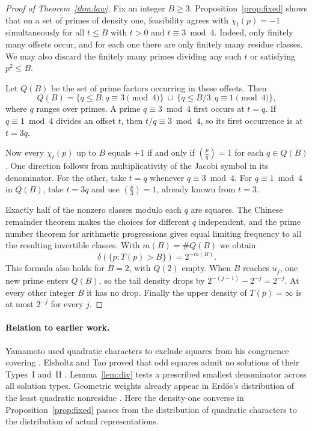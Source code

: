 \documentclass[11pt,a4paper]{article}
\theoremstyle{definition}
\newcommand{\jac}[2]{\left(\frac{#1}{#2}\right)}
\begin{document}
\begin{proof}[Proof of Theorem~\ref{thm:law}]
Fix an integer \(B\ge3\). Proposition~\ref{prop:fixed} shows that on
a set of primes of density one, feasibility agrees with
\(\chi_t(p)=-1\) simultaneously for all \(t\le B\) with
\(t>0\) and \(t\equiv3\bmod4\). Indeed, only finitely many offsets
occur, and for each one there are only finitely many residue classes.
We may also discard the finitely many primes dividing any such \(t\)
or satisfying \(p^2\le B\).

Let \(Q(B)\) be the set of prime factors occurring in these offsets.
Then
\[
  Q(B)=\{q\le B:q\equiv3\pmod4\}
       \ \cup\ \{q\le B/3:q\equiv1\pmod4\},
\]
where \(q\) ranges over primes. A prime \(q\equiv3\bmod4\) first
occurs at \(t=q\). If \(q\equiv1\bmod4\) divides an offset \(t\),
then \(t/q\equiv3\bmod4\), so its first occurrence is at \(t=3q\).

Now every \(\chi_t(p)\) up to \(B\) equals \(+1\) if and only if
\(\jac{p}{q}=1\) for each \(q\in Q(B)\). One direction follows
from multiplicativity of the Jacobi symbol in its denominator.
For the other, take \(t=q\) whenever \(q\equiv3\bmod4\). For
\(q\equiv1\bmod4\) in \(Q(B)\), take \(t=3q\) and use
\(\jac{p}{3}=1\), already known from \(t=3\).

Exactly half of the nonzero classes modulo each \(q\) are squares.
The Chinese remainder theorem makes the choices for different \(q\)
independent, and the prime number theorem for arithmetic progressions
gives equal limiting frequency to all the resulting invertible
classes. With \(m(B)=\#Q(B)\) we obtain
\[
  \delta(\{p:T(p)>B\})=2^{-m(B)}.
\]
This formula also holds for \(B=2\), with \(Q(2)\) empty.
When \(B\) reaches \(u_j\), one new prime enters \(Q(B)\), so
the tail density drops by \(2^{-(j-1)}-2^{-j}=2^{-j}\).
At every other integer \(B\) it has no drop. Finally the upper
density of \(T(p)=\infty\) is at most \(2^{-j}\) for every \(j\).
\end{proof}

\paragraph{Relation to earlier work.}
Yamamoto used quadratic characters to exclude squares from his
congruence covering \cite[Theorem~2]{yamamoto}.
Elsholtz and Tao proved that odd squares admit no solutions of their
Types~I and~II \cite[Proposition~1.6]{elsholtztao}.
Lemma~\ref{lem:div} tests a prescribed smallest denominator across
all solution types. Geometric weights already appear in
Erd\H{o}s's distribution of the least quadratic nonresidue
\cite[equation~(7)]{erdos}. Here the density-one converse in
Proposition~\ref{prop:fixed} passes from the distribution of
quadratic characters to the distribution of actual representations.
\end{document}
